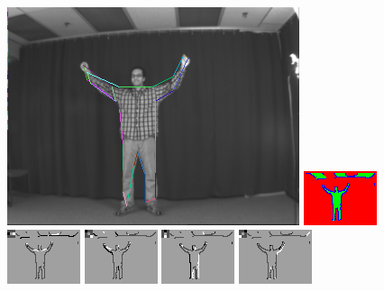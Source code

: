 \begin{figure}
\includegraphics[width=0.48 \linewidth]{output/2.detection/local_inference/out.s1.0060.d/thefinalparse.png}
\includegraphics[width=0.48 \linewidth]{output/2.detection/local_inference/out.s1.0060.d/local.x5.interior.png}
\includegraphics[width=0.24 \linewidth]{output/2.detection/local_inference/out.s1.0060.d/local.x5.orientations.0.png}
\includegraphics[width=0.24 \linewidth]{output/2.detection/local_inference/out.s1.0060.d/local.x5.orientations.1.png}
\includegraphics[width=0.24 \linewidth]{output/2.detection/local_inference/out.s1.0060.d/local.x5.orientations.2.png}
\includegraphics[width=0.24 \linewidth]{output/2.detection/local_inference/out.s1.0060.d/local.x5.orientations.3.png}

\end{figure}
